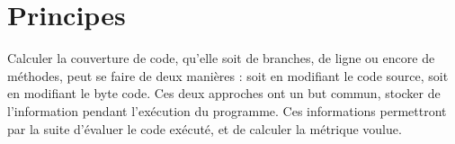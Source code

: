 \section{Principes}
\label{sec:principes}

Calculer la couverture de code, qu'elle soit de branches, de ligne ou encore de méthodes, peut se faire de deux manières\cite{baxter} : soit en modifiant le code source, soit en modifiant le byte code. Ces deux approches ont un but commun, stocker de l’information pendant l’exécution du programme. Ces informations permettront par la suite d’évaluer le code exécuté, et de calculer la métrique voulue.
